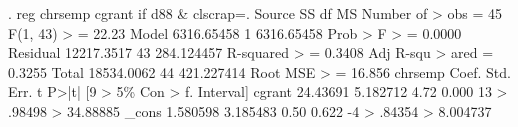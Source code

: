 . reg chrsemp cgrant if d88 \& clscrap{\tytilde}=.
{\smallskip}
      Source {\VBAR}       SS           df       MS      Number of
>  obs   =        45
   F(1, 43) 
>        =     22.23
       Model {\VBAR}  6316.65458         1  6316.65458   Prob > F 
>        =    0.0000
    Residual {\VBAR}  12217.3517        43  284.124457   R-squared
>        =    0.3408
   Adj R-squ
> ared   =    0.3255
       Total {\VBAR}  18534.0062        44  421.227414   Root MSE 
>        =    16.856
{\smallskip}
     chrsemp {\VBAR}      Coef.   Std. Err.      t    P>|t|     [9
> 5\% Con                                                    
>       f. Interval]
      cgrant {\VBAR}   24.43691   5.182712     4.72   0.000     13
> .98498                                                    
>           34.88885
       _cons {\VBAR}   1.580598   3.185483     0.50   0.622     -4
> .84354                                                    
>           8.004737
{\smallskip}
